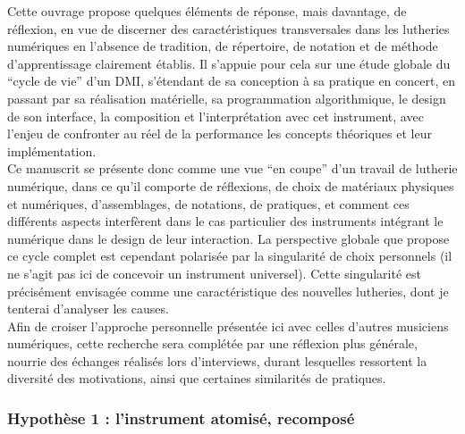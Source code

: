 \noindent Cette ouvrage propose quelques éléments de réponse, mais davantage, de réflexion, en vue de discerner des caractéristiques transversales dans les lutheries numériques en l'absence de tradition, de répertoire, de notation et de méthode d'apprentissage clairement établis. Il s'appuie pour cela sur une étude globale du ``cycle de vie'' d'un \gls{DMI}, s'étendant de sa conception à sa pratique en concert, en passant par sa réalisation matérielle, sa programmation algorithmique, le design de son interface, la composition et l'interprétation avec cet instrument, avec l'enjeu de confronter au réel de la performance les concepts théoriques et leur implémentation.\\
\indent Ce manuscrit se présente donc comme une vue ``en coupe'' d'un travail de lutherie numérique, dans ce qu'il comporte de réflexions, de choix de matériaux physiques et numériques, d'assemblages, de notations, de pratiques, et comment ces différents aspects interfèrent dans le cas particulier des instruments intégrant le numérique dans le design de leur interaction. La perspective globale que propose ce cycle complet est cependant polarisée par la singularité de choix personnels (il ne s'agit pas ici de concevoir un instrument universel). Cette singularité est précisément envisagée comme une caractéristique des nouvelles lutheries, dont je tenterai d'analyser les causes.\\
\indent Afin de croiser l'approche personnelle présentée ici avec celles d'autres musiciens numériques, cette recherche sera complétée par une réflexion plus générale, nourrie des échanges réalisés lors d'interviews, durant lesquelles ressortent la diversité des motivations, ainsi que certaines similarités de pratiques.

\subsubsection*{Hypothèse 1 : l'instrument atomisé, recomposé}

